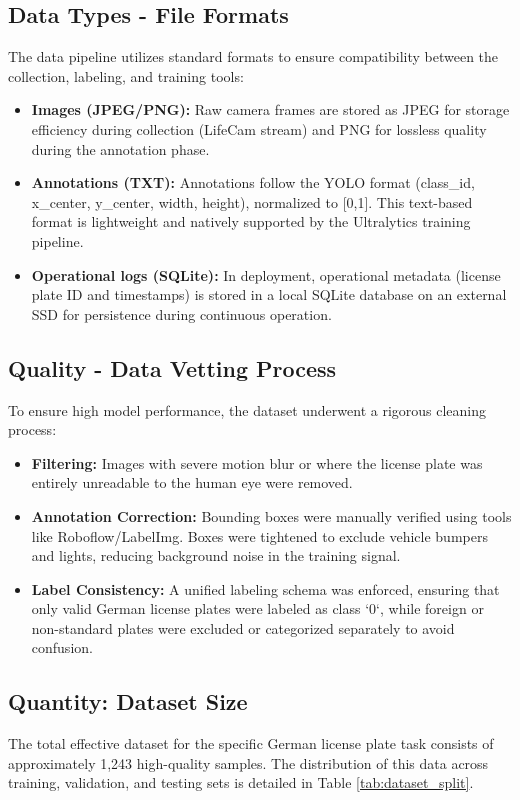 \subsection{Data Types - File Formats}
The data pipeline utilizes standard formats to ensure compatibility between the collection, labeling, and training tools:
\begin{itemize}
	\item \textbf{Images (JPEG/PNG):} Raw camera frames are stored as JPEG for storage efficiency during collection (LifeCam stream) and PNG for lossless quality during the annotation phase.
	\item \textbf{Annotations (TXT):} Annotations follow the YOLO format (class\_id, x\_center, y\_center, width, height), normalized to [0,1]. This text-based format is lightweight and natively supported by the Ultralytics training pipeline.
	\item \textbf{Operational logs (SQLite):} In deployment, operational metadata (license plate ID and timestamps) is stored in a local SQLite database on an external SSD for persistence during continuous operation.
\end{itemize}

\subsection{Quality - Data Vetting Process}
To ensure high model performance, the dataset underwent a rigorous cleaning process:
\begin{itemize}
	\item \textbf{Filtering:} Images with severe motion blur or where the license plate was entirely unreadable to the human eye were removed.
	\item \textbf{Annotation Correction:} Bounding boxes were manually verified using tools like Roboflow/LabelImg. Boxes were tightened to exclude vehicle bumpers and lights, reducing background noise in the training signal.
	\item \textbf{Label Consistency:} A unified labeling schema was enforced, ensuring that only valid German license plates were labeled as class `0`, while foreign or non-standard plates were excluded or categorized separately to avoid confusion.
\end{itemize}

\subsection{Quantity: Dataset Size}
The total effective dataset for the specific German license plate task consists of approximately 1,243 high-quality samples. The distribution of this data across training, validation, and testing sets is detailed in Table \ref{tab:dataset_split}.

